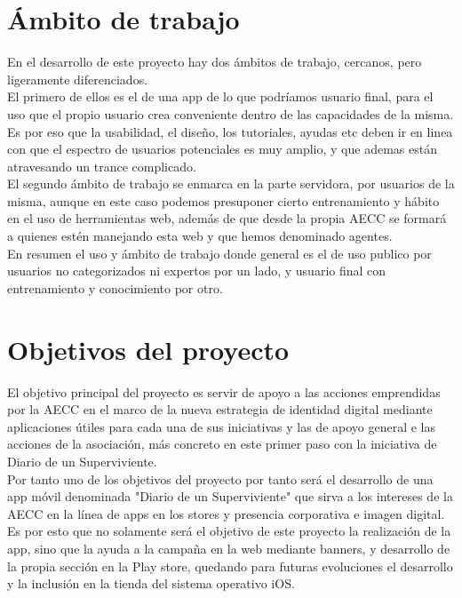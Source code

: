 \documentclass[../pfc.tex]{subfiles}
\begin{document}
\section{Ámbito de trabajo}

En el desarrollo de este proyecto hay dos ámbitos de trabajo, cercanos, pero ligeramente diferenciados.\\

El primero de ellos es el de una app de lo que podríamos usuario final, para el uso que el propio usuario crea conveniente dentro de las capacidades de la misma. Es por eso que la usabilidad, el diseño, los tutoriales, ayudas etc deben ir en linea con que el espectro de usuarios potenciales es muy amplio, y que ademas están atravesando un trance complicado.\\

El segundo ámbito de trabajo se enmarca en la parte servidora, por usuarios de la misma, aunque en este caso podemos presuponer cierto entrenamiento y hábito en el uso de herramientas web, además de que desde la propia AECC se formará a quienes estén manejando esta web y que hemos denominado agentes.\\

En resumen el uso y ámbito de trabajo donde general es el de uso publico por usuarios no categorizados ni expertos por un lado, y usuario final con entrenamiento y conocimiento por otro.

\section{Objetivos del proyecto}
El objetivo principal del proyecto es servir de apoyo a las acciones emprendidas por la AECC en el marco de la nueva estrategia de identidad digital mediante aplicaciones útiles para cada una de sus iniciativas y las de apoyo general e las acciones de la asociación, más concreto en este primer paso con la iniciativa de Diario de un Superviviente.\\

Por tanto uno de los objetivos del proyecto por tanto será el desarrollo de una app móvil denominada "Diario de un Superviviente" que sirva a los intereses de la AECC en la línea de apps en los stores y presencia corporativa e imagen digital. Es por esto que no solamente será el objetivo de este proyecto la realización de la app, sino que la ayuda a la campaña en la web mediante banners, y desarrollo de la propia sección en la Play store, quedando para futuras evoluciones el desarrollo y la inclusión en la tienda del sistema operativo iOS.\\
\end{document}
